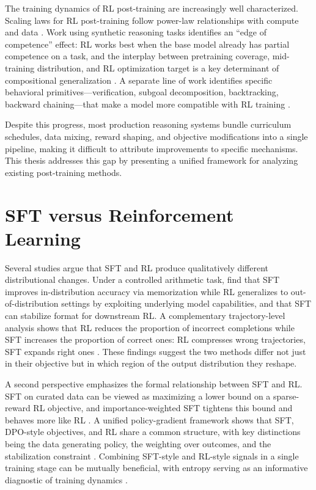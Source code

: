\documentclass[12pt]{cmuthesis}
\begin{document}
The training dynamics of RL post-training are increasingly well characterized.
Scaling laws for RL post-training follow power-law relationships with compute and data \citep{tanScalingBehaviorsLLM2025}.
Work using synthetic reasoning tasks identifies an ``edge of competence'' effect: RL works best when the base model already has partial competence on a task, and the interplay between pretraining coverage, mid-training distribution, and RL optimization target is a key determinant of compositional generalization \citep{zhangInterplayPreTrainingMidTraining2025}.
A separate line of work identifies specific behavioral primitives---verification, subgoal decomposition, backtracking, backward chaining---that make a model more compatible with RL training \citep{gandhiCognitiveBehaviorsThat2025}.

Despite this progress, most production reasoning systems bundle curriculum schedules, data mixing, reward shaping, and objective modifications into a single pipeline, making it difficult to attribute improvements to specific mechanisms.
This thesis addresses this gap by presenting a unified framework for analyzing existing post-training methods.

\section{SFT versus Reinforcement Learning}

Several studies argue that SFT and RL produce qualitatively different distributional changes.
Under a controlled arithmetic task, \citet{chuSFTMemorizesRL2025} find that SFT improves in-distribution accuracy via memorization while RL generalizes to out-of-distribution settings by exploiting underlying model capabilities, and that SFT can stabilize format for downstream RL.
A complementary trajectory-level analysis shows that RL reduces the proportion of incorrect completions while SFT increases the proportion of correct ones: RL compresses wrong trajectories, SFT expands right ones \citep{matsutaniRLSqueezesSFT2025}.
These findings suggest the two methods differ not just in their objective but in which region of the output distribution they reshape.

A second perspective emphasizes the formal relationship between SFT and RL.
SFT on curated data can be viewed as maximizing a lower bound on a sparse-reward RL objective, and importance-weighted SFT tightens this bound and behaves more like RL \citep{qinSupervisedFineTuning2025}.
A unified policy-gradient framework shows that SFT, DPO-style objectives, and RL share a common structure, with key distinctions being the data generating policy, the weighting over outcomes, and the stabilization constraint \citep{lvUnifiedViewLarge2026}.
Combining SFT-style and RL-style signals in a single training stage can be mutually beneficial, with entropy serving as an informative diagnostic of training dynamics \citep{fuSRFTSingleStageMethod2025}.
\end{document}

